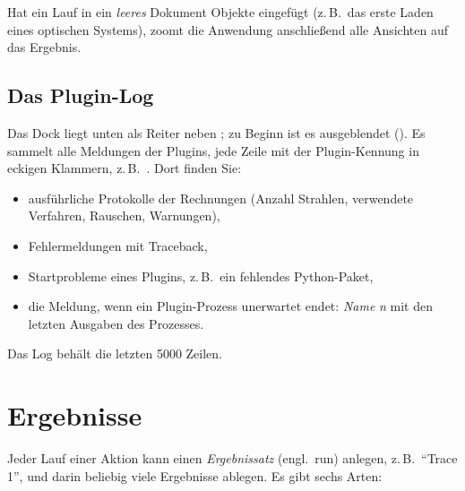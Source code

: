 Hat ein Lauf in ein \emph{leeres} Dokument Objekte eingefügt (z.\,B.\ das erste Laden eines
optischen Systems), zoomt die Anwendung anschließend alle Ansichten auf das Ergebnis.

\subsection{Das Plugin-Log}\label{sec:plugin-log}

Das Dock  liegt unten als Reiter neben ; zu Beginn ist es
ausgeblendet (). Es sammelt alle Meldungen der Plugins, jede Zeile mit
der Plugin-Kennung in eckigen Klammern, z.\,B.\ . Dort finden Sie:

\begin{itemize}
  \item ausführliche Protokolle der Rechnungen (Anzahl Strahlen, verwendete Verfahren,
        Rauschen, Warnungen),
  \item Fehlermeldungen mit Traceback,
  \item Startprobleme eines Plugins, z.\,B.\ ein fehlendes Python-Paket,
  \item die Meldung, wenn ein Plugin-Prozess unerwartet endet:
        \textit{Name} \textit{n}\code{)}
        mit den letzten Ausgaben des Prozesses.
\end{itemize}

Das Log behält die letzten 5000 Zeilen.

\section{Ergebnisse}\label{sec:plugin-ergebnisse}

Jeder Lauf einer Aktion kann einen \emph{Ergebnissatz} (engl.\ run) anlegen,
z.\,B.\ \enquote{Trace 1}, und darin beliebig viele Ergebnisse ablegen. Es gibt sechs Arten:

